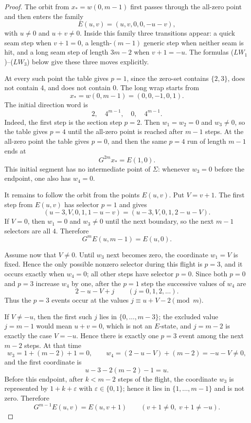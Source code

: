 \documentclass[10pt,a4paper]{amsart}
\begin{document}
\begin{proof}
The orbit from \(x_*=w(0,m-1)\) first passes through the all-zero point and then enters the family
\[
E(u,v)=(u,v,0,0,-u-v),
\]
with \(u\ne0\) and \(u+v\ne0\).  Inside this family three transitions appear: a quick seam step when
\(v+1=0\), a length-\((m-1)\) generic step when neither seam is hit, and a long seam step of length
\(3m-2\) when \(v+1=-u\).  The formulas \textup{(\(LW_1\))}--\textup{(\(LW_3\))} below give these three moves
explicitly.

At every such point the table gives \(p=1\), since the zero-set
contains \(\{2,3\}\), does not contain \(4\), and does not contain \(0\).  The long wrap starts from
\[
x_*=w(0,m-1)=(0,0,-1,0,1).
\]
The initial direction word is
\[
2,\quad 4^{m-1},\quad 0,\quad 4^{m-1}.
\]
Indeed, the first step is the section step \(p=2\).  Then \(w_1=w_2=0\) and \(w_3\ne0\), so the table
gives \(p=4\) until the all-zero point is reached after \(m-1\) steps.  At the all-zero point the table
gives \(p=0\), and then the same \(p=4\) run of length \(m-1\) ends at
\[
G^{2m}x_*=E(1,0).
\]
This initial segment has no intermediate point of \(\Sigma\): whenever \(w_3=0\) before the endpoint,
one also has \(w_4=0\).

It remains to follow the orbit from the points \(E(u,v)\).  Put \(V=v+1\).  The first step from
\(E(u,v)\) has selector \(p=1\) and gives
\[
(u-3,V,0,1,1-u-v)=(u-3,V,0,1,2-u-V).
\]
If \(V=0\), then \(w_1=0\) and \(w_3\ne0\) until the next boundary, so the next \(m-1\) selectors are
all \(4\).  Therefore
\[
G^mE(u,m-1)=E(u,0). \tag{$LW_1$}
\]

Assume now that \(V\ne0\).  Until \(w_3\) next becomes zero, the coordinate \(w_1=V\) is fixed.  Hence
the only possible nonzero selector during this flight is \(p=3\), and it occurs exactly when
\(w_4=0\); all other steps have selector \(p=0\).  Since both \(p=0\) and \(p=3\) increase \(w_4\) by
one, after the \(p=1\) step the successive values of \(w_4\) are
\[
2-u-V+j\qquad (j=0,1,2,\ldots).
\]
Thus the \(p=3\) events occur at the values \(j\equiv u+V-2\pmod m\).

If \(V\ne -u\), then the first such \(j\) lies in \(\{0,
\ldots,m-3\}\); the excluded value \(j=m-1\) would mean \(u+v=0\), which is not an \(E\)-state, and
\(j=m-2\) is exactly the case \(V=-u\).  Hence there is exactly one \(p=3\) event among the next
\(m-2\) steps.  At that time
\[
w_3=1+(m-2)+1=0,
\qquad
w_4=(2-u-V)+(m-2)=-u-V\ne0,
\]
and the first coordinate is
\[
u-3-2(m-2)-1=u.
\]
Before this endpoint, after \(k<m-2\) steps of the flight, the coordinate \(w_3\) is represented by
\(1+k+\varepsilon\) with \(\varepsilon\in\{0,1\}\); hence it lies in \(\{1,\ldots,m-1\}\) and is not zero.
Therefore
\[
G^{m-1}E(u,v)=E(u,v+1)\qquad (v+1\ne0,\; v+1\ne -u). \tag{$LW_2$}
\]


\end{proof}
\end{document}

